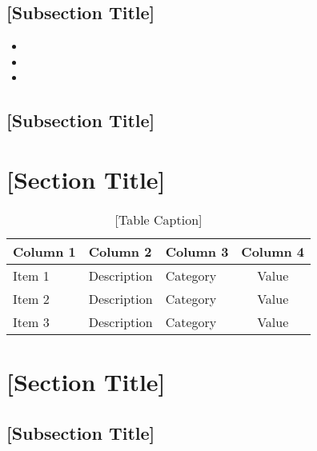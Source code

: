 \documentclass[a4paper,12pt]{article}
\begin{document}
\lipsum[8-9]

\subsection{{[Subsection Title]}}
\begin{itemize}[left=1em, itemsep=0pt, topsep=0pt] 
    \item \lipsum[10][1-2]
    \item \lipsum[10][3-4]
    \item \lipsum[10][5-6]
\end{itemize}

\subsection{{[Subsection Title]}}
\lipsum[11]

\newpage

\section{{[Section Title]}}
\label{sec:section4}

\lipsum[12-13]

\begin{center}
    \begin{table}[h!]
    \small
    \caption{[Table Caption]}
    \renewcommand{\arraystretch}{1.25}
    \label{tab:example_table}
    \begin{tabular}{|l|l|l|c|}
    \hline
    \textbf{Column 1} & \textbf{Column 2} & \textbf{Column 3} & \textbf{Column 4} \\
    \hline
    Item 1 & Description & Category & Value \\
    Item 2 & Description & Category & Value \\
    Item 3 & Description & Category & Value \\
    \hline
    \end{tabular}
    \end{table}
\end{center}

\newpage

\section{{[Section Title]}}
\label{sec:section5}

\lipsum[14-15]

\subsection{{[Subsection Title]}}
\lipsum[16]
\end{document}
